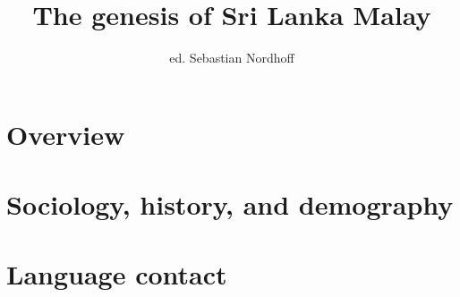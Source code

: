 \documentclass[a4paper]{book}
\author{ed. Sebastian Nordhoff}
\title{The genesis of Sri Lanka Malay}
\newcommand{\imgpath}{}
\begin{document}
\glossSTDmode
\maketitle
\frontmatter
\newpage

\newpage
 
\newpage
 
\newpage

\newpage




\mainmatter
\part{Overview}

\setcounter{exx}{0}\setcounter{footnote}{0}
\renewcommand{\imgpath}{./introduction/} 



\setcounter{exx}{0}\setcounter{footnote}{0}
\renewcommand{\imgpath}{./nordhoffgrammar/} 



\part{Sociology, history, and demography} 
\renewcommand{\imgpath}{./bakker/} 
\setcounter{exx}{0}\setcounter{footnote}{0}



\setcounter{exx}{0}\setcounter{footnote}{0}
\renewcommand{\imgpath}{./slomanson/}



\setcounter{exx}{0}\setcounter{footnote}{0}



\part{Language contact}
  


 
\setcounter{exx}{0}\setcounter{footnote}{0}


 
\setcounter{exx}{0}\setcounter{footnote}{0}
\renewcommand{\imgpath}{./smith/}


 
\setcounter{exx}{0}\setcounter{footnote}{0}


 
\setcounter{exx}{0}\setcounter{footnote}{0}



\backmatter



\end{document}
